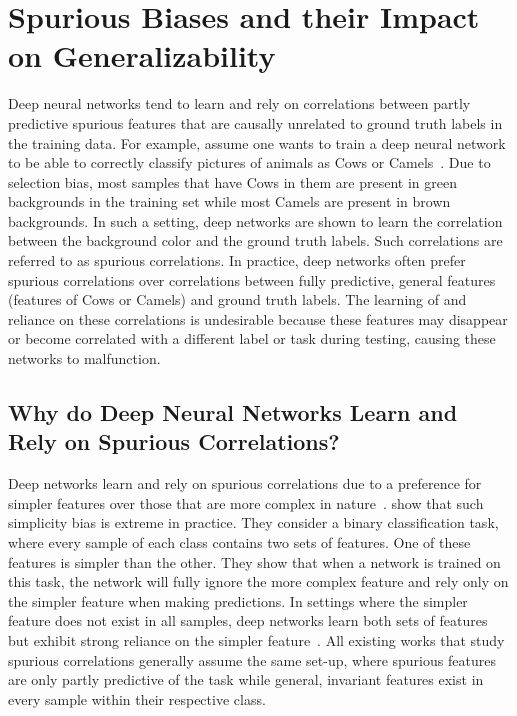 \section{Spurious Biases and their Impact on Generalizability}\label{sec:bias}
\vspace{0.1in}
Deep neural networks tend to learn and rely on correlations between partly predictive spurious features that are causally unrelated to ground truth labels in the training data. For example, assume one wants to train a deep neural network to be able to correctly classify pictures of animals as Cows or Camels~\cite{Arjovsky2019}. Due to selection bias, most samples that have Cows in them are present in green backgrounds in the training set while most Camels are present in brown backgrounds. In such a setting, deep networks are shown to learn the correlation between the background color and the ground truth labels. Such correlations are referred to as spurious correlations. In practice, deep networks often prefer spurious correlations over correlations between fully predictive, general features (features of Cows or Camels) and ground truth labels. The learning of and reliance on these correlations is undesirable because these features may disappear or become correlated with a different label or task during testing, causing these networks to malfunction.

\vspace{0.1in}
\subsection{Why do Deep Neural Networks Learn and Rely on Spurious Correlations?} Deep networks learn and rely on spurious correlations due to a preference for simpler features over those that are more complex in nature~\cite{geirhos2020shortcut,Kirichenko2023ICLR}. \cite{Shah2020Neurips} show that such simplicity bias is extreme in practice. They consider a binary classification task, where every sample of each class contains two sets of features. One of these features is simpler than the other. They show that when a network is trained on this task, the network will fully ignore the more complex feature and rely only on the simpler feature when making predictions. In settings where the simpler feature does not exist in all samples, deep networks learn both sets of features but exhibit strong reliance on the simpler feature~\cite{Kirichenko2023ICLR}. All existing works that study spurious correlations generally assume the same set-up, where spurious features are only partly predictive of the task while general, invariant features exist in every sample within their respective class.


